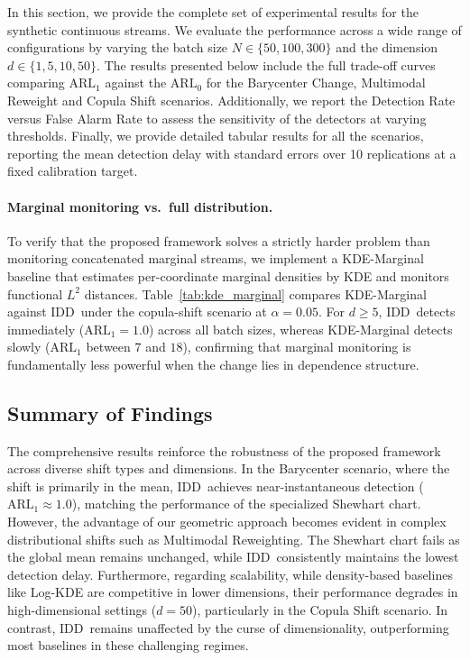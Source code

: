 \documentclass{article}
\newcommand{\arlo}{$\mathrm{ARL}_1$\xspace}
\newcommand{\arlz}{$\mathrm{ARL}_0$\xspace}
\newcommand{\algoname}{\textsc{IDD}\xspace}
\theoremstyle{plain}
\theoremstyle{definition}
\theoremstyle{remark}
\begin{document}
In this section, we provide the complete set of experimental results for the synthetic continuous streams. We evaluate the performance across a wide range of configurations by varying the batch size $N \in \{50, 100, 300\}$ and the dimension $d \in \{1, 5, 10, 50\}$. 
The results presented below include the full trade-off curves comparing \arlo against the \arlz for the Barycenter Change, Multimodal Reweight and Copula Shift scenarios. 
Additionally, we report the Detection Rate versus False Alarm Rate to assess the sensitivity of the detectors at varying thresholds. 
Finally, we provide detailed tabular results for all the scenarios, reporting the mean detection delay with standard errors over 10 replications at a fixed calibration target.


\paragraph{Marginal monitoring vs.\ full distribution.} To verify that the proposed framework solves a strictly harder problem than monitoring concatenated marginal streams, we implement a KDE-Marginal baseline that estimates per-coordinate marginal densities by KDE and monitors functional $L^2$ distances. Table~\ref{tab:kde_marginal} compares KDE-Marginal against \algoname\ under the copula-shift scenario at $\alpha=0.05$. For $d\ge 5$, \algoname\ detects immediately ($\mathrm{ARL}_1=1.0$) across all batch sizes, whereas KDE-Marginal detects slowly ($\mathrm{ARL}_1$ between $7$ and $18$), confirming that marginal monitoring is fundamentally less powerful when the change lies in dependence structure.









\subsection{Summary of Findings}
The comprehensive results reinforce the robustness of the proposed framework across diverse shift types and dimensions. In the Barycenter scenario, where the shift is primarily in the mean, \algoname\ achieves near-instantaneous detection ($\mathrm{ARL}_1 \approx 1.0$), matching the performance of the specialized Shewhart chart. 
However, the advantage of our geometric approach becomes evident in complex distributional shifts such as Multimodal Reweighting.
The Shewhart chart fails as the global mean remains unchanged, while \algoname\ consistently maintains the lowest detection delay. 
Furthermore, regarding scalability, while density-based baselines like Log-KDE are competitive in lower dimensions, their performance degrades in high-dimensional settings ($d=50$), particularly in the Copula Shift scenario. In contrast, \algoname\ remains unaffected by the curse of dimensionality, outperforming most baselines in these challenging regimes.
\end{document}

